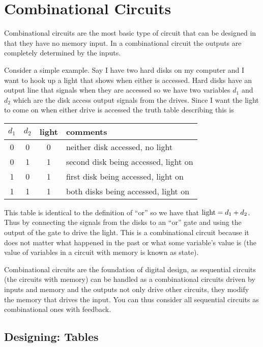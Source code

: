 \chapter{Combinational Circuits}
\label{c-comb}


Combinational circuits are the most basic type of circuit that can be designed in that they have no memory input.  In a combinational circuit the outputs are completely determined by the inputs.

Consider a simple example.  Say I have two hard disks on my computer and I want to hook up a light that shows when either is accessed.  Hard disks have an output line that signals when they are accessed so we have two variables $d_1$ and $d_2$ which are the disk access output signals from the drives.  Since I want the light to come on when either drive is accessed the truth table describing this is

\begin{tabular}{c|c||cl}
$d_1$ & $d_2$ & light & comments\\ \hline
0     & 0     & 0     & neither disk accessed, no light \\
0     & 1     & 1     & second disk being accessed, light on \\
1     & 0     & 1     & first disk being accessed, light on \\
1     & 1     & 1     & both disks being accessed, light on \\
\end{tabular}

This table is identical to the definition of ``or'' so we have that $\hbox{light}=d_1 + d_2$.  Thus by connecting the signals from the disks to an ``or'' gate and using the output of the gate to drive the light.  This is a combinational circuit because it does not matter what happened in the past or what some variable's value is (the value of variables in a circuit with memory is known as state).

Combinational circuits are the foundation of digital design, as sequential circuits (the circuits with memory) can be handled as a combinational circuits driven by inputs and memory and the outputs not only drive other circuits, they modify the memory that drives the input.  You can thus consider all sequential circuits as combinational ones with feedback.



\section{Designing: Tables}

